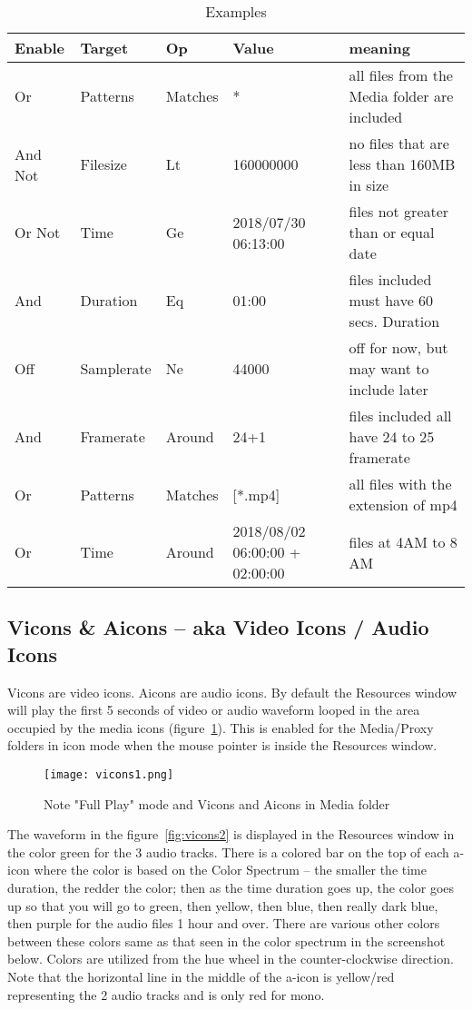 \begin{table}[htpb]
    \centering
    \caption{Examples}
    \label{tab:label}
    \small
    \begin{tabular}{lllm{10em}m{10em}} \toprule
        Enable&	Target&	Op&	Value&	meaning\\\midrule
Or	&Patterns  &Matches   &*&	 all files from the Media folder are included\\
And Not&Filesize&Lt	&160000000& no files that are less than 160MB in size \\
Or Not&	Time	&Ge	&2018/07/30 06:13:00	& files not greater than or equal date\\
And	&Duration&Eq	&01:00		& files included must have 60 secs. Duration\\
Off	&Samplerate&Ne	&44000		& off for now, but may want to include later\\
And	&Framerate&Around&24+1		& files included all have 24 to 25 framerate\\
Or	&Patterns&Matches&[*.mp4]	& all files with the extension of mp4\\
Or	&Time&	Around&2018/08/02 06:00:00 + 02:00:00  & files at 4AM to 8 AM\\\bottomrule
    \end{tabular}
\end{table}


\subsection{Vicons \& Aicons – aka Video Icons / Audio Icons}%
\label{sub:vicons_aicons_aka_video_icons_audio_icons}

Vicons are video icons.  
Aicons are audio icons.  
By default the Resources window will play the first 5 seconds of video or audio waveform looped in the area occupied by the media icons (figure~\ref{fig:vicons1}). 
This is enabled for the Media/Proxy folders in icon mode when the mouse pointer is inside the Resources window. 

\begin{figure}[htpb]
    \centering
    \texttt{[image: vicons1.png]}
    \caption{Note "Full Play" mode and Vicons and Aicons in Media folder}
    \label{fig:vicons1}
\end{figure}

The waveform in the figure~\ref{fig:vicons2} is displayed in the Resources window in the color green for the 3 audio tracks. 
There is a colored bar on the top of each a-icon where the color is based on the Color Spectrum -- the smaller the time duration, the redder the color; then as the time duration goes up, the color goes up so that you will go to green, then yellow, then blue, then really dark blue, then purple for the audio files 1 hour and over.  
There are various other colors between these colors same as that seen in the color spectrum in the screenshot below.  
Colors are utilized from the hue wheel in the counter-clockwise direction.  
Note that the horizontal line in the middle of the a-icon is yellow/red representing the 2 audio tracks and is only red for mono.



